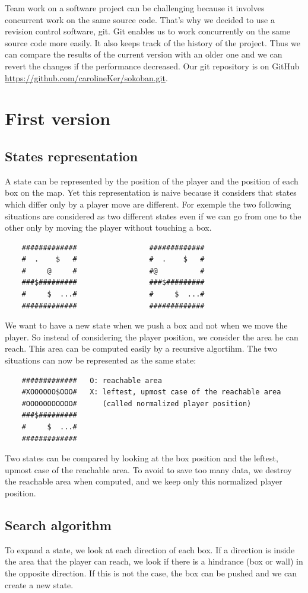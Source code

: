 \documentclass[a4paper,10pt]{article}
\begin{document}
	Team work on a software project can be challenging because it involves concurrent work on the same source code. 
	That's why we decided to use a revision control software, git. 
	Git enables us to work concurrently on the same source code more easily.
	It also keeps track of the history of the project.
	Thus we can compare the results of the current version with an older one
	and we can revert the changes if the performance decreased.
	Our git repository is on GitHub \url{https://github.com/carolineKer/sokoban.git}.

\section{First version}
	\subsection{States representation}
	A state can be represented by the position of the player and the position of each box on the map. 
	Yet this representation is naive because it considers that states which differ only by a player move are different.
	For exemple the two following situations are considered as two different states even if we can go from one to the other only by moving the 
	player without touching a box.
	\begin{verbatim}
	#############                 #############
	#  .    $   #                 #  .    $   #
	#     @     #                 #@          #
	###$#########                 ###$#########
	#     $  ...#                 #     $  ...#
	#############                 #############
	\end{verbatim}
	We want to have a new state when we push a box and not when we move the player.
	So instead of considering the player position, we consider the area he can reach.
	This area can be computed easily by a recursive algortihm.
	The two situations can now be represented as the same state:
	\begin{verbatim}
	#############   O: reachable area
	#XOOOOOO$OOO#   X: leftest, upmost case of the reachable area 
	#OOOOOOOOOOO#      (called normalized player position)
	###$#########
	#     $  ...#
	#############
	\end{verbatim}
	Two states can be compared by looking at the box position and the leftest, upmost case of the reachable area.
	To avoid to save too many data, we destroy the reachable area when computed, and we keep only this normalized player position.
	
	\subsection{Search algorithm}
	To expand a state, we look at each direction of each box. 
	If a direction is inside the area that the player can reach, we look if there is a hindrance (box or wall) in the opposite direction.
	If this is not the case, the box can be pushed and we can create a new state.
\end{document}
